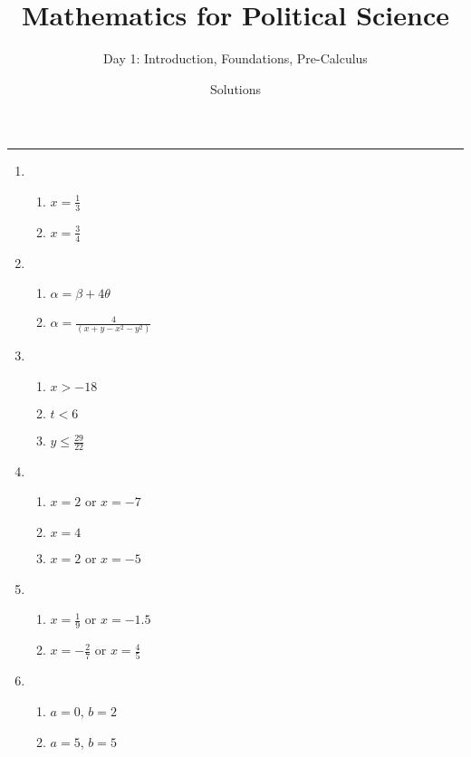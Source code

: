 \documentclass[11pt]{article}
\title{\Large{\bf{\vspace{-100pt}Mathematics for Political Science \vspace{-15pt}}}}
\author{\large{Day 1: Introduction, Foundations, Pre-Calculus}}
\date{\vspace{-5pt}\large{Solutions \vspace{-10pt}}}
\begin{document}
\maketitle

\hrule




\begin{enumerate}



\item 
\begin{enumerate}
\item $x = \frac{1}{3}$
\item $x = \frac{3}{4}$
\end{enumerate}


\item 
\begin{enumerate}
\item $\alpha = \beta + 4\theta$
\item $\alpha = \frac{4}{(x + y - x^2 - y^2)}$
\end{enumerate}


\item 
\begin{enumerate}
\item $x > -18$
\item $t < 6$
\item $y \leq \frac{29}{22}$
\end{enumerate}


\item 
\begin{enumerate}
\item $x = 2$ or $x=-7$
\item $x=4$
\item $x=2$ or $x=-5$
\end{enumerate}


\item 
\begin{enumerate}
\item $x=\frac{1}{9}$ or $x=-1.5$
\item $x= -\frac{2}{7}$ or $x=\frac{4}{5}$
\end{enumerate}


\item 
\begin{enumerate}
\item $a=0$, $b=2$
\item $a=5$, $b=5$
\end{enumerate}




\end{enumerate}
\end{document}

